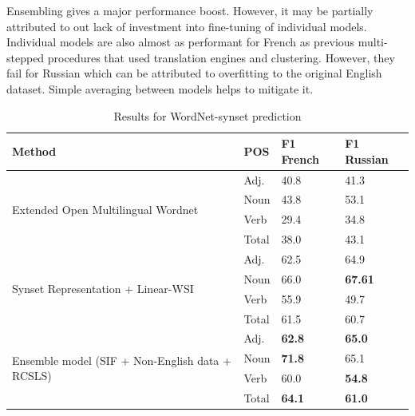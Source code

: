 \documentclass[11pt,a4paper]{article}
\begin{document}
Ensembling gives a major performance boost. However, it may be partially attributed to out lack of investment into fine-tuning of individual models. Individual models are also almost as performant for French as previous multi-stepped procedures that used translation engines and clustering. However, they fail for Russian which can be attributed to overfitting to the original English dataset. Simple averaging between models helps to mitigate it.
\begin{table}[!htb]
	\small
	\caption{Results for WordNet-synset prediction}
	\label{wordnet-results}		
	\centering
	\begin{tabular}{l l l l}
		Method & POS & F1 French & F1 Russian
		\\
		\hline
		\multirow{4}{*}{Extended Open Multilingual Wordnet \newline \cite{bond-wordnet}}
		& \multicolumn{1}{l}{Adj.} & \multicolumn{1}{l}{40.8} & \multicolumn{1}{l}{41.3} \\
		& \multicolumn{1}{l}{Noun} & \multicolumn{1}{l}{43.8} & \multicolumn{1}{l}{53.1} \\
		& \multicolumn{1}{l}{Verb} & \multicolumn{1}{l}{29.4} & \multicolumn{1}{l}{34.8} \\
		& \multicolumn{1}{l}{Total} & \multicolumn{1}{l}{38.0} & \multicolumn{1}{l}{43.1} \\
		\hline
		\multirow{4}{*}{Synset Representation + Linear-WSI \cite{Khodak2017}}
		& \multicolumn{1}{l}{Adj.} & \multicolumn{1}{l}{62.5} & \multicolumn{1}{l}{64.9} \\
		& \multicolumn{1}{l}{Noun} & \multicolumn{1}{l}{66.0} & \multicolumn{1}{l}{\textbf{67.61}} \\
		& \multicolumn{1}{l}{Verb} & \multicolumn{1}{l}{55.9} & \multicolumn{1}{l}{49.7} \\
		& \multicolumn{1}{l}{Total} & \multicolumn{1}{l}{61.5} & \multicolumn{1}{l}{60.7} \\
		
		\hline
		\multirow{4}{*}{Ensemble model (SIF + Non-English data + RCSLS)}
		& \multicolumn{1}{l}{Adj.} & \multicolumn{1}{l}{\textbf{62.8}} & \multicolumn{1}{l}{\textbf{65.0}} \\
		& \multicolumn{1}{l}{Noun} & \multicolumn{1}{l}{\textbf{71.8}} & \multicolumn{1}{l}{65.1} \\
		& \multicolumn{1}{l}{Verb} & \multicolumn{1}{l}{60.0} & \multicolumn{1}{l}{\textbf{54.8}} \\
		& \multicolumn{1}{l}{Total} & \multicolumn{1}{l}{\textbf{64.1}} & \multicolumn{1}{l}{\textbf{61.0}} \\
		

\end{tabular}
\end{table}
\end{document}
